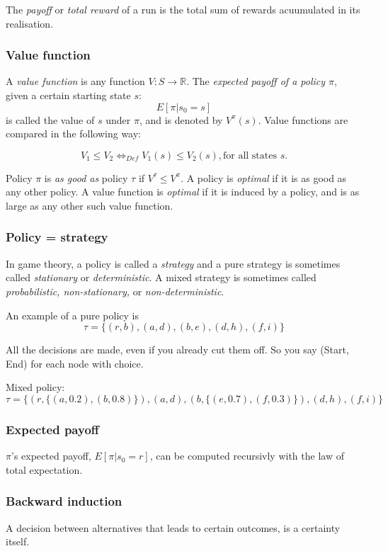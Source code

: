 \documentclass{article}
\begin{document}
The \emph{payoff} or \emph{total reward} of a run is the total sum of rewards
acuumulated in its realisation.

\subsubsection{Value function}
A \emph{value function} is any function $V: S \to \mathbb{R}$. The
\emph{expected payoff of a policy $\pi$}, given a certain starting state $s$:
	\[E[\pi|s_0=s]\]
	is called the value of $s$ under $\pi$, and is denoted by $V^\pi(s)$.
Value functions are compared in the following way:

\[ V_1 \le V_2 \Leftrightarrow_{Def} V_1(s) \le V_2(s), \mbox{for all states } s.\]

Policy $\pi$ is \emph{as good as} policy $\tau$ if $V^\tau \le V^\pi$. A policy
is \emph{optimal} if it is as good as any other policy. A value function is
\emph{optimal} if it is induced by a policy, and is as large as any other
such value function.

\subsubsection{Policy = strategy}
In game theory, a policy is called a \emph{strategy} and a pure strategy is
sometimes called \emph{stationary} or \emph{deterministic}. A mixed strategy
is sometimes called \emph{probabilistic, non-stationary,} or
\emph{non-deterministic}.

An example of a pure policy is
\[ \tau = \{(r,b),(a,d),(b,e),(d,h),(f,i)\} \]

All the decisions are made, even if you already cut them off.
So you say (Start, End) for each node with choice.

Mixed policy:
\[ \tau = \{(r,\{(a, 0.2), (b,0.8)\}),(a,d),(b,\{(e, 0.7), (f,0.3)\}),
(d,h),(f,i)\} \]

\subsubsection{Expected payoff}
$\pi$'s expected payoff, $E[\pi|s_0=r]$, can be computed recursivly with the
law of total expectation.

\subsubsection{Backward induction}
A decision between alternatives that leads to certain outcomes, is a certainty
itself.
\end{document}
